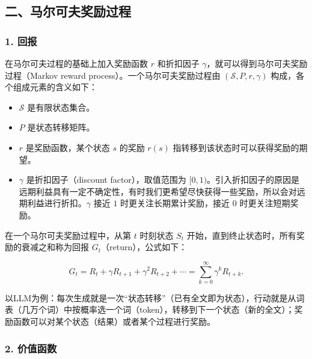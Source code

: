 \hypertarget{ux4e8cux9a6cux5c14ux53efux592bux5956ux52b1ux8fc7ux7a0b}{%
\subsection{二、马尔可夫奖励过程}\label{ux4e8cux9a6cux5c14ux53efux592bux5956ux52b1ux8fc7ux7a0b}}

\hypertarget{ux56deux62a5}{%
\subsubsection{1. 回报}\label{ux56deux62a5}}

在马尔可夫过程的基础上加入奖励函数 \(r\) 和折扣因子 \(\gamma\)，就可以得到马尔可夫奖励过程（Markov reward process）。一个马尔可夫奖励过程由 \((\mathcal{S},P,r,\gamma)\) 构成，各个组成元素的含义如下：

\begin{itemize}
\tightlist
\item
  \(\mathcal{S}\) 是有限状态集合。
\item
  \(P\) 是状态转移矩阵。
\item
  \(r\) 是奖励函数，某个状态 \(s\) 的奖励 \(r(s)\) 指转移到该状态时可以获得奖励的期望。
\item
  \(\gamma\) 是折扣因子（discount factor），取值范围为 \([0,1)\)。引入折扣因子的原因是远期利益具有一定不确定性，有时我们更希望尽快获得一些奖励，所以会对远期利益进行折扣。\(\gamma\) 接近 \(1\) 时更关注长期累计奖励，接近 \(0\) 时更关注短期奖励。
\end{itemize}

在一个马尔可夫奖励过程中，从第 \(t\) 时刻状态 \(S_t\) 开始，直到终止状态时，所有奖励的衰减之和称为回报 \(G_t\)（return），公式如下：

\[
G_t=R_t+\gamma R_{t+1}+\gamma^{2} R_{t+2}+\cdots
=\sum_{k=0}^{\infty}\gamma^{k} R_{t+k}.
\]

以LLM为例：每次生成就是一次``状态转移''（已有全文即为状态），行动就是从词表（几万个词）中按概率选一个词（token），转移到下一个状态（新的全文）；奖励函数可以对某个状态（结果）或者某个过程进行奖励。

\hypertarget{ux4ef7ux503cux51fdux6570}{%
\subsubsection{2. 价值函数}\label{ux4ef7ux503cux51fdux6570}}

